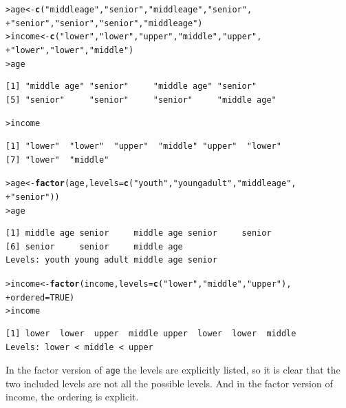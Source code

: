 \documentclass[12pt,oneside]{book}\usepackage[]{graphicx}\usepackage[]{color}
\makeatletter
\newcommand{\hlnum}[1]{\textcolor[rgb]{0.686,0.059,0.569}{#1}}%
\newcommand{\hlstr}[1]{\textcolor[rgb]{0.192,0.494,0.8}{#1}}%
\newcommand{\hlstd}[1]{\textcolor[rgb]{0.345,0.345,0.345}{#1}}%
\newcommand{\hlkwb}[1]{\textcolor[rgb]{0.69,0.353,0.396}{#1}}%
\newcommand{\hlkwc}[1]{\textcolor[rgb]{0.333,0.667,0.333}{#1}}%
\newcommand{\hlkwd}[1]{\textcolor[rgb]{0.737,0.353,0.396}{\textbf{#1}}}%
\newenvironment{kframe}{%
 \def\at@end@of@kframe{}%
 \ifinner\ifhmode%
  \def\at@end@of@kframe{\end{minipage}}%
  \begin{minipage}{\columnwidth}%
 \fi\fi%
 \def\FrameCommand##1{\hskip\@totalleftmargin \hskip-\fboxsep
 \colorbox{shadecolor}{##1}\hskip-\fboxsep
     \hskip-\linewidth \hskip-\@totalleftmargin \hskip\columnwidth}%
 \MakeFramed {\advance\hsize-\width
   \@totalleftmargin\z@ \linewidth\hsize
   \@setminipage}}%
 {\par\unskip\endMakeFramed%
 \at@end@of@kframe}
\newenvironment{knitrout}{}{} %
\makeatother
\begin{document}
\begin{knitrout}
\color{fgcolor}\begin{kframe}
\begin{alltt}
\hlstd{> }\hlstd{age} \hlkwb{<-} \hlkwd{c}\hlstd{(}\hlstr{"middle age"}\hlstd{,} \hlstr{"senior"}\hlstd{,} \hlstr{"middle age"}\hlstd{,} \hlstr{"senior"}\hlstd{,}
\hlstd{+ }         \hlstr{"senior"}\hlstd{,} \hlstr{"senior"}\hlstd{,} \hlstr{"senior"}\hlstd{,} \hlstr{"middle age"}\hlstd{)}
\hlstd{> }\hlstd{income} \hlkwb{<-} \hlkwd{c}\hlstd{(}\hlstr{"lower"}\hlstd{,} \hlstr{"lower"}\hlstd{,} \hlstr{"upper"}\hlstd{,} \hlstr{"middle"}\hlstd{,} \hlstr{"upper"}\hlstd{,}
\hlstd{+ }            \hlstr{"lower"}\hlstd{,} \hlstr{"lower"}\hlstd{,} \hlstr{"middle"}\hlstd{)}
\hlstd{> }\hlstd{age}
\end{alltt}
\begin{verbatim}
[1] "middle age" "senior"     "middle age" "senior"    
[5] "senior"     "senior"     "senior"     "middle age"
\end{verbatim}
\begin{alltt}
\hlstd{> }\hlstd{income}
\end{alltt}
\begin{verbatim}
[1] "lower"  "lower"  "upper"  "middle" "upper"  "lower" 
[7] "lower"  "middle"
\end{verbatim}
\begin{alltt}
\hlstd{> }\hlstd{age} \hlkwb{<-} \hlkwd{factor}\hlstd{(age,} \hlkwc{levels}\hlstd{=}\hlkwd{c}\hlstd{(}\hlstr{"youth"}\hlstd{,} \hlstr{"young adult"}\hlstd{,} \hlstr{"middle age"}\hlstd{,}
\hlstd{+ }                            \hlstr{"senior"}\hlstd{))}
\hlstd{> }\hlstd{age}
\end{alltt}
\begin{verbatim}
[1] middle age senior     middle age senior     senior    
[6] senior     senior     middle age
Levels: youth young adult middle age senior
\end{verbatim}
\begin{alltt}
\hlstd{> }\hlstd{income} \hlkwb{<-} \hlkwd{factor}\hlstd{(income,} \hlkwc{levels}\hlstd{=}\hlkwd{c}\hlstd{(}\hlstr{"lower"}\hlstd{,} \hlstr{"middle"}\hlstd{,} \hlstr{"upper"}\hlstd{),}
\hlstd{+ }                 \hlkwc{ordered} \hlstd{=} \hlnum{TRUE}\hlstd{)}
\hlstd{> }\hlstd{income}
\end{alltt}
\begin{verbatim}
[1] lower  lower  upper  middle upper  lower  lower  middle
Levels: lower < middle < upper
\end{verbatim}
\end{kframe}
\end{knitrout}
In the factor version of \verb+age+ the levels are explicitly listed, so it is clear that the two included levels are not all the possible levels. And in the factor version of income, the ordering is explicit.
\end{document}
